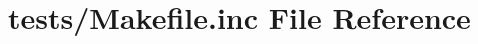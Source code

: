 \hypertarget{tests_2_makefile_8inc}{\section{tests/\+Makefile.inc File Reference}
\label{tests_2_makefile_8inc}
}
